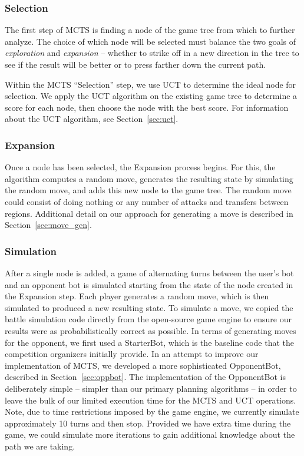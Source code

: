 \documentclass[a4paper,11pt]{article}
\begin{document}
\subsubsection{Selection}
The first step of MCTS is finding a node of the game tree from which to further 
analyze.  The choice of which node will be selected must balance the two goals of 
\emph{exploration} and \emph{expansion} -- whether to strike off in a new direction in the 
tree to see if the result will be better or to press farther down the current path.

Within the MCTS ``Selection'' step, we use UCT to determine the ideal node for 
selection.  We apply the UCT algorithm on the existing game tree to determine a score for each node, 
then choose the node with the best score.  For information about the UCT algorithm, see Section~\ref{sec:uct}.

\subsubsection{Expansion}
Once a node has been selected, the Expansion process begins. For this, 
the algorithm computes a random move, generates the resulting state by simulating the random move, 
and adds this new node to the game tree. The random move could consist of doing nothing or any 
number of attacks and transfers between regions.  Additional detail on our approach for generating
a move is described in Section~\ref{sec:move_gen}.

\subsubsection{Simulation}
After a single node is added, a game of alternating turns between the user's bot and an 
opponent bot is simulated starting from the state of the node created in the Expansion step.  
Each player generates a random move, which is then simulated to produced a new resulting state.
To simulate a move, we copied the battle simulation code directly from the open-source game engine
to ensure our results were as probabilistically correct as possible. In terms of generating moves
for the opponent, we first used a StarterBot, which is the baseline code that the competition 
organizers initially provide.  In an attempt to improve our implementation of MCTS, we developed 
a more sophisticated OpponentBot, described in Section~\ref{sec:oppbot}.  The implementation of the
OpponentBot is deliberately simple -- simpler than our primary planning algorithms -- in order to 
leave the bulk of our limited execution time for the MCTS and UCT operations.  Note, due to time 
restrictions imposed by the game engine, we currently simulate approximately 10 turns and then stop.  
Provided we have extra time during the game, we could simulate more iterations to gain additional
 knowledge about the path we are taking.
\end{document}
